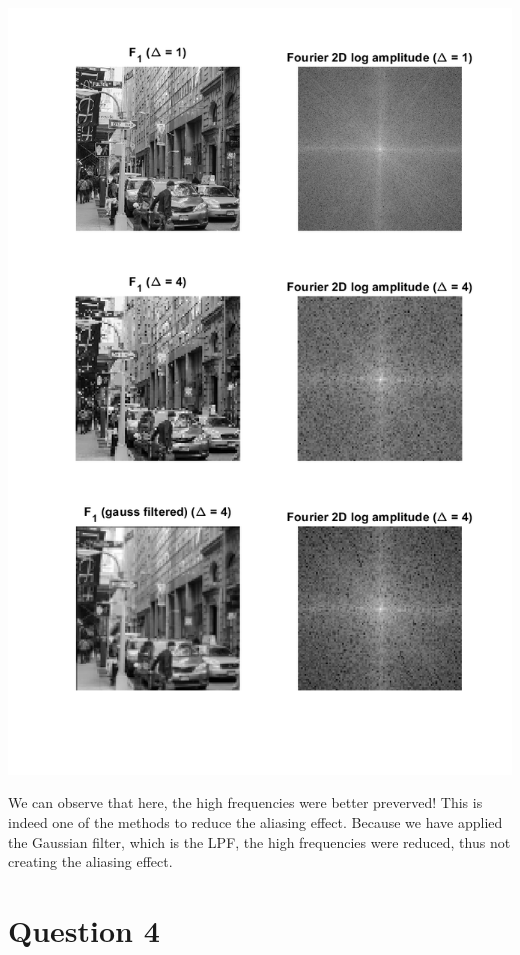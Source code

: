 \documentclass[a4paper]{iacas}
\begin{document}
\vskip 0.1in
\begin{minipage}{1\textwidth}
\centering
	\includegraphics[scale=0.7]{../imgs/q1_7.png}
\end{minipage}
\vskip 0.1in

We can observe that here, the high frequencies were better preverved! This is indeed one of the methods to reduce the aliasing effect. Because we have applied the Gaussian filter, which is the LPF, the high frequencies were reduced, thus not creating the aliasing effect. 



\section{Question 4}
\end{document}
